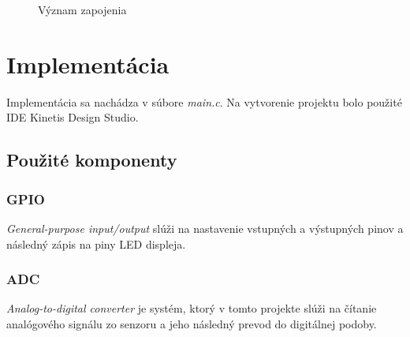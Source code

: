 \documentclass[11pt,a4paper]{article}
\begin{document}
	\begin{figure}[h] 
		\centering
		\caption{Význam zapojenia}
		\label{pins}
	\end{figure}	
	\newpage
	\section{Implementácia}
	Implementácia sa nachádza v súbore \emph{main.c}. Na vytvorenie projektu bolo použité IDE Kinetis Design Studio.
	
	\subsection{Použité komponenty}
	\subsubsection{GPIO}
	\emph{General-purpose input/output}  slúži na nastavenie vstupných a výstupných pinov a následný zápis na piny LED displeja.
	\subsubsection{ADC}
	\emph{Analog-to-digital converter} je systém, ktorý v tomto projekte slúži na čítanie analógového signálu zo senzoru a jeho následný prevod do digitálnej podoby.
\end{document}
